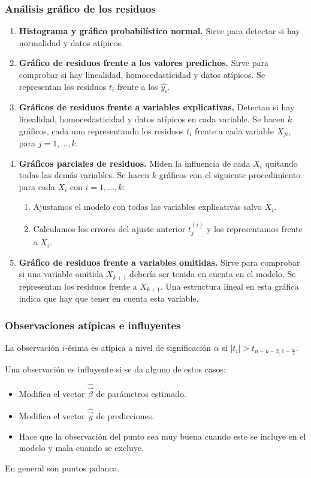 \subsubsection*{Análisis gráfico de los residuos}
\begin{enumerate}
    \item \textbf{Histograma y gráfico probabilístico normal.}
          Sirve para detectar si hay normalidad y datos atípicos.
    \item \textbf{Gráfico de residuos frente a los valores predichos.}
          Sirve para comprobar si hay linealidad, homocedasticidad y datos atípicos.
          Se representan los residuos $t_i$ frente a los $\hat{y_i}$.
    \item \textbf{Gráficos de residuos frente a variables explicativas.}
          Detectan si hay linealidad, homocedasticidad y datos atípicos en cada variable.
          Se hacen $k$ gráficos, cada uno representando los residuos $t_i$ frente a cada variable $X_{ji}$, para $j = 1, \dots, k$.
    \item \textbf{Gráficos parciales de residuos.}
          Miden la influencia de cada $X_i$ quitando todas las demás variables.
          Se hacen $k$ gráficos con el siguiente procedimiento para cada $X_i$ con $i = 1, \dots, k$:
          \begin{enumerate}
              \item Ajustamos el modelo con todas las variables explicativas salvo $X_i$.
              \item Calculamos los errores del ajuste anterior $t_j^{(i)}$ y los representamos frente a $X_i$.
          \end{enumerate}
    \item \textbf{Gráfico de residuos frente a variables omitidas.}
          Sirve para comprobar si una variable omitida $X_{k+1}$ debería ser tenida en cuenta en el modelo.
          Se representan los residuos frente a $X_{k+1}$.
          Una estructura lineal en esta gráfica indica que hay que tener en cuenta esta variable.
\end{enumerate}

\subsubsection*{Observaciones atípicas e influyentes}
La observación $i$-ésima es atípica a nivel de significación $\alpha$ si $|t_i| > t_{n-k-2, 1-\frac{\alpha}{2}}$.

Una observación es influyente si se da alguno de estos casos:
\begin{itemize}
    \item Modifica el vector $\hat{\vec{\beta}}$ de parámetros estimado.
    \item Modifica el vector $\hat{\vec{y}}$ de predicciones.
    \item Hace que la observación del punto sea muy buena cuando este se incluye en el modelo y mala cuando se excluye.
\end{itemize}
En general son puntos palanca.

